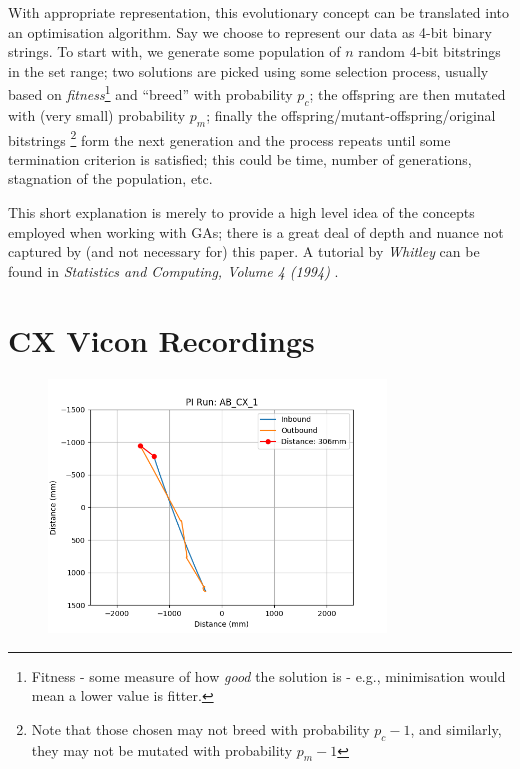 \documentclass[a4paper,11pt,twoside,openright]{article}
\let\oldsection\section
\def\section{\cleardoublepage\oldsection}
\begin{document}
With appropriate representation, this evolutionary concept can be
translated into an optimisation algorithm. Say we choose to represent our data as
4-bit binary strings. To start with, we generate some population of $n$ random
4-bit bitstrings in the set range; two solutions are picked using some selection
process, usually based on \textit{fitness}\footnote{Fitness - some measure of how
  \textit{good} the solution is - e.g., minimisation would mean a lower value is
  fitter.} and ``breed'' with probability $p_c$; the offspring are then mutated
with (very small) probability $p_m$; finally the
offspring/mutant-offspring/original bitstrings \footnote{Note that those chosen
  may not breed with probability $p_c - 1$, and
similarly, they may not be mutated with probability $p_m - 1$} form the next
generation and the process repeats until some termination criterion is satisfied;
this could be time, number of generations, stagnation of the population, etc.
\newline
\par

This short explanation is merely to provide a high level idea of the concepts
employed when working with GAs; there is a great deal of depth and nuance
not captured by (and not necessary for) this paper. A tutorial by
\textit{Whitley} can be found in \textit{Statistics and Computing, Volume 4
  (1994)} \cite{Whitley1994}. 

\section{CX Vicon Recordings}\label{ap:cxfigs}
\begin{figure}[h!]
  \centering
  \includegraphics[width=0.8\textwidth]{AB_CX_1}
  \caption{\label{fig:abcx1}}
\end{figure}
\end{document}
